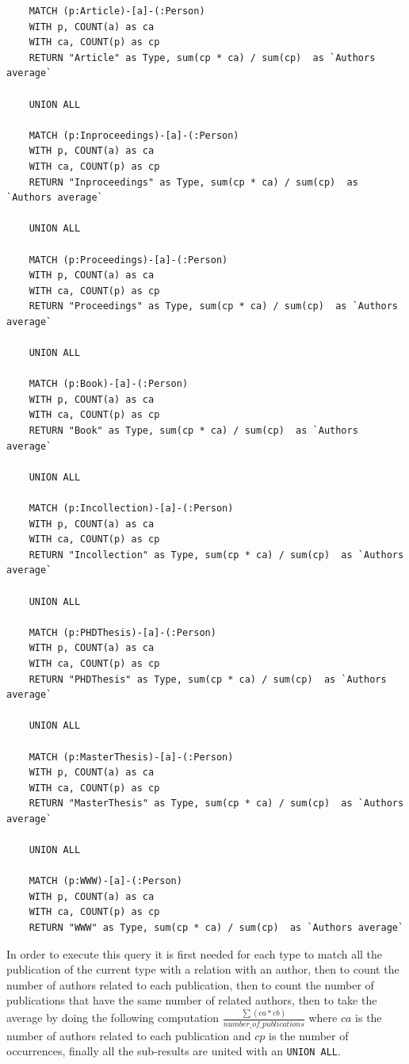 \documentclass{article}
\begin{document}
\begin{lstlisting}
    MATCH (p:Article)-[a]-(:Person)
    WITH p, COUNT(a) as ca
    WITH ca, COUNT(p) as cp
    RETURN "Article" as Type, sum(cp * ca) / sum(cp)  as `Authors average`
    
    UNION ALL
    
    MATCH (p:Inproceedings)-[a]-(:Person)
    WITH p, COUNT(a) as ca
    WITH ca, COUNT(p) as cp
    RETURN "Inproceedings" as Type, sum(cp * ca) / sum(cp)  as `Authors average`    
    
    UNION ALL
    
    MATCH (p:Proceedings)-[a]-(:Person)
    WITH p, COUNT(a) as ca
    WITH ca, COUNT(p) as cp
    RETURN "Proceedings" as Type, sum(cp * ca) / sum(cp)  as `Authors average`    
    
    UNION ALL
    
    MATCH (p:Book)-[a]-(:Person) 
    WITH p, COUNT(a) as ca
    WITH ca, COUNT(p) as cp
    RETURN "Book" as Type, sum(cp * ca) / sum(cp)  as `Authors average`    
    
    UNION ALL
    
    MATCH (p:Incollection)-[a]-(:Person) 
    WITH p, COUNT(a) as ca
    WITH ca, COUNT(p) as cp
    RETURN "Incollection" as Type, sum(cp * ca) / sum(cp)  as `Authors average`
    
    UNION ALL
    
    MATCH (p:PHDThesis)-[a]-(:Person) 
    WITH p, COUNT(a) as ca
    WITH ca, COUNT(p) as cp
    RETURN "PHDThesis" as Type, sum(cp * ca) / sum(cp)  as `Authors average`
    
    UNION ALL
    
    MATCH (p:MasterThesis)-[a]-(:Person)
    WITH p, COUNT(a) as ca
    WITH ca, COUNT(p) as cp
    RETURN "MasterThesis" as Type, sum(cp * ca) / sum(cp)  as `Authors average`    
    
    UNION ALL
    
    MATCH (p:WWW)-[a]-(:Person)
    WITH p, COUNT(a) as ca
    WITH ca, COUNT(p) as cp
    RETURN "WWW" as Type, sum(cp * ca) / sum(cp)  as `Authors average`
\end{lstlisting}

In order to execute this query it is first needed for each type to match all the publication of the current type with a relation with an author, then to count the number of authors related to each publication, then to count the number of publications that have the same number of related authors, then to take the average by doing the following computation $\frac{\sum(ca * cb)}{number\_of\_publications}$ where $ca$ is the number of authors related to each publication and $cp$ is the number of occurrences, finally all the sub-results are united with an \texttt{UNION ALL}.
\end{document}
